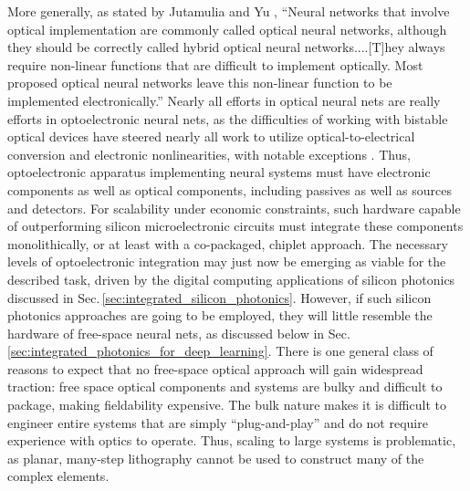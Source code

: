 More generally, as stated by Jutamulia and Yu \cite{juyu1996}, ``Neural networks that involve optical implementation are commonly called optical neural networks, although they should be correctly called hybrid optical neural networks....[T]hey always require non-linear functions that are difficult to implement optically. Most proposed optical neural networks leave this non-linear function to be implemented electronically.'' Nearly all efforts in optical neural nets are really efforts in optoelectronic neural nets, as the difficulties of working with bistable optical devices \cite{ke1985} have steered nearly all work to utilize optical-to-electrical conversion and electronic nonlinearities, with notable exceptions \cite{prsh2017,more_refs_here}. Thus, optoelectronic apparatus implementing neural systems must have electronic components as well as optical components, including passives as well as sources and detectors. For scalability under economic constraints, such hardware capable of outperforming silicon microelectronic circuits must integrate these components monolithically, or at least with a co-packaged, chiplet approach. The necessary levels of optoelectronic integration may just now be emerging as viable for the described task, driven by the digital computing applications of silicon photonics discussed in Sec.\,\ref{sec:integrated_silicon_photonics}. However, if such silicon photonics approaches are going to be employed, they will little resemble the hardware of free-space neural nets, as discussed below in Sec.\,\ref{sec:integrated_photonics_for_deep_learning}. There is one general class of reasons to expect that no free-space optical approach will gain widespread traction: free space optical components and systems are bulky and difficult to package, making fieldability expensive. The bulk nature makes it is difficult to engineer entire systems that are simply ``plug-and-play'' and do not require experience with optics to operate. Thus, scaling to large systems is problematic, as planar, many-step lithography cannot be used to construct many of the complex elements.

